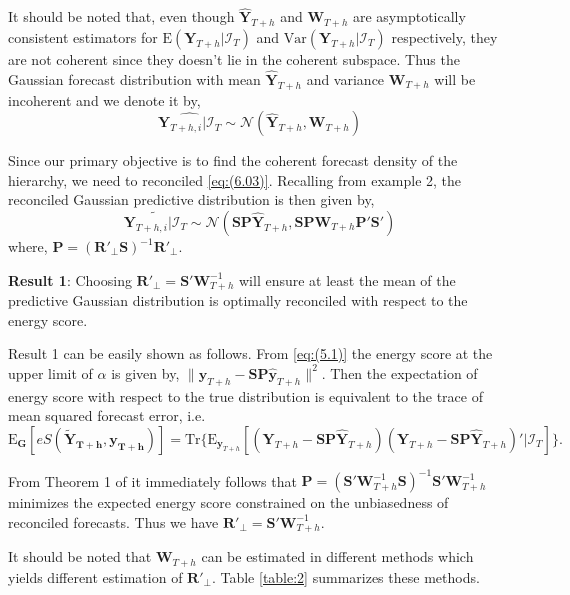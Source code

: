 \documentclass[a4paper, 11pt]{article}
\def\E{\text{E}}
\begin{document}
It should be noted that, even though $\hat{\bm{Y}}_{T+h}$ and $\bm{W}_{T+h}$ are asymptotically consistent estimators for $\E(\bm{Y}_{T+h}|\bm{\mathcal{I}}_T)$ and $\text{Var}(\bm{Y}_{T+h}|\bm{\mathcal{I}}_T)$ respectively, they are not coherent since they doesn't lie in the coherent subspace. Thus the Gaussian forecast distribution with mean $\hat{\bm{Y}}_{T+h}$ and variance $\bm{W}_{T+h}$ will be incoherent and we denote it by,
\begin{equation}\label{eq:(6.03)}
\widehat{\bm{Y}_{T+h,i}|\bm{\mathcal{I}}_T} \sim \mathscr{N}(\hat{\bm{Y}}_{T+h}, \bm{W}_{T+h})
\end{equation}

Since our primary objective is to find the coherent forecast density of the hierarchy, we need to reconciled \eqref{eq:(6.03)}. Recalling from example 2, the reconciled Gaussian predictive distribution is then given by,
\begin{equation}\label{eq:(6.04)}
\widetilde{\bm{Y}_{T+h,i}|\bm{\mathcal{I}}_T} \sim \mathscr{N}(\bm{SP}\hat{\bm{Y}}_{T+h}, \bm{SP}\bm{W}_{T+h}\bm{P}'\bm{S}')
\end{equation}
where, $\bm{P} = (\bm{R}'_\bot \bm{S})^{-1}\bm{R}'_\bot$.

\textbf{Result 1}: Choosing $\bm{R}'_\bot = \bm{S}'\bm{W}_{T+h}^{-1}$ will ensure at least the mean of the predictive Gaussian distribution is optimally reconciled with respect to the energy score.

Result 1 can be easily shown as follows. From \eqref{eq:(5.1)} the energy score at the upper limit of $\alpha$ is given by, $\|\bm{y}_{T+h}-\bm{SP}\hat{\bm{y}}_{T+h}\|^2$. Then the expectation of energy score with respect to the true distribution is equivalent to the trace of mean squared forecast error, i.e.
$$
\E_{\bm{G}}[eS(\bm{\tilde{Y}_{T+h},y_{T+h}})]= \text{Tr}\{\E_{\bm{y}_{T+h}}[(\bm{Y}_{T+h}-\bm{SP}\hat{\bm{Y}}_{T+h})(\bm{Y}_{T+h}-\bm{SP}\hat{\bm{Y}}_{T+h})'|\mathcal{I}_{T}]\}.
$$

From Theorem 1 of \citet{Wickramasuriya2017} it immediately follows that $\bm{P} = (\bm{S}'\bm{W}_{T+h}^{-1}\bm{S})^{-1}\bm{S}'\bm{W}_{T+h}^{-1}$ minimizes the expected energy score constrained on the unbiasedness of reconciled forecasts. Thus we have $\bm{R}'_\bot = \bm{S}'\bm{W}_{T+h}^{-1}$.

It should be noted that $\bm{W}_{T+h}$ can be estimated in different methods which yields different estimation of $\bm{R}'_\bot$. Table \ref{table:2} summarizes these methods.
\end{document}
